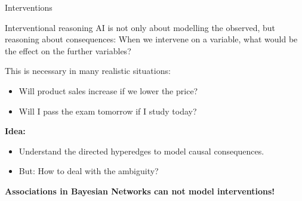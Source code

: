 \documentclass{beamer}
\begin{document}
    \begin{frame}{Interventions}

        \begin{block}{Interventional reasoning}
            AI is not only about modelling the observed, but reasoning about consequences:
            When we intervene on a variable, what would be the effect on the further variables?
        \end{block}

        This is necessary in many realistic situations:
        \begin{itemize}
            \item Will product sales increase if we lower the price?
            \item Will I pass the exam tomorrow if I study today?
        \end{itemize}

            {\bf Idea:}
        \begin{itemize}
            \item Understand the directed hyperedges to model causal consequences.
            \item But: How to deal with the ambiguity?
        \end{itemize}

        \begin{center}
            \bf Associations in Bayesian Networks can not model interventions!
        \end{center}
    \end{frame}
\end{document}
